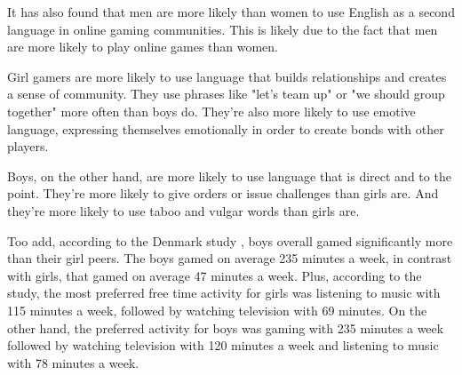 \documentclass[10pt,twoside,english,a4paper]{article}
\begin{document}
It has also found that men are more likely than women to use English as a second language in online gaming communities. This is likely due to the fact that men are more likely to play online games than women.

Girl gamers are more likely to use language that builds relationships and creates a sense of community. They use phrases like "let's team up" or "we should group together" more often than boys do. They're also more likely to use emotive language, expressing themselves emotionally in order to create bonds with other players.

Boys, on the other hand, are more likely to use language that is direct and to the point. They're more likely to give orders or issue challenges than girls are. And they're more likely to use taboo and vulgar words than girls are.

Too add, according to the Denmark study \cite{Denmark_study}, boys overall gamed significantly more than their girl peers. The boys gamed on average 235 minutes a week, in contrast with girls, that gamed on average 47 minutes a week. Plus, according to the study, the most preferred free time activity for girls was listening to music with 115 minutes a week, followed by watching television with 69 minutes. On the other hand, the preferred activity for boys was gaming with 235 minutes a week followed by watching television with 120 minutes a week and listening to music with 78 minutes a week.









\end{document}
